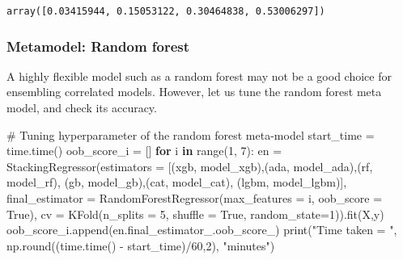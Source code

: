 \documentclass[
  letterpaper,
  DIV=11,
  numbers=noendperiod]{scrreprt}
\newenvironment{Shaded}{\begin{snugshade}}{\end{snugshade}}
\newcommand{\BuiltInTok}[1]{\textcolor[rgb]{0.00,0.23,0.31}{#1}}
\newcommand{\CommentTok}[1]{\textcolor[rgb]{0.37,0.37,0.37}{#1}}
\newcommand{\ControlFlowTok}[1]{\textcolor[rgb]{0.00,0.23,0.31}{\textbf{#1}}}
\newcommand{\DecValTok}[1]{\textcolor[rgb]{0.68,0.00,0.00}{#1}}
\newcommand{\KeywordTok}[1]{\textcolor[rgb]{0.00,0.23,0.31}{\textbf{#1}}}
\newcommand{\NormalTok}[1]{\textcolor[rgb]{0.00,0.23,0.31}{#1}}
\newcommand{\OperatorTok}[1]{\textcolor[rgb]{0.37,0.37,0.37}{#1}}
\newcommand{\StringTok}[1]{\textcolor[rgb]{0.13,0.47,0.30}{#1}}
\newcommand{\VariableTok}[1]{\textcolor[rgb]{0.07,0.07,0.07}{#1}}
\begin{document}
\begin{verbatim}
array([0.03415944, 0.15053122, 0.30464838, 0.53006297])
\end{verbatim}

\subsubsection{Metamodel: Random forest}\label{metamodel-random-forest}

A highly flexible model such as a random forest may not be a good choice
for ensembling correlated models. However, let us tune the random forest
meta model, and check its accuracy.

\begin{Shaded}
\begin{Highlighting}[]
\CommentTok{\# Tuning hyperparameter of the random forest meta{-}model}
\NormalTok{start\_time }\OperatorTok{=}\NormalTok{ time.time()}
\NormalTok{oob\_score\_i }\OperatorTok{=}\NormalTok{ []}
\ControlFlowTok{for}\NormalTok{ i }\KeywordTok{in} \BuiltInTok{range}\NormalTok{(}\DecValTok{1}\NormalTok{, }\DecValTok{7}\NormalTok{):}
\NormalTok{    en }\OperatorTok{=}\NormalTok{ StackingRegressor(estimators }\OperatorTok{=}\NormalTok{ [(}\StringTok{\textquotesingle{}xgb\textquotesingle{}}\NormalTok{, model\_xgb),(}\StringTok{\textquotesingle{}ada\textquotesingle{}}\NormalTok{, model\_ada),(}\StringTok{\textquotesingle{}rf\textquotesingle{}}\NormalTok{, model\_rf),}
\NormalTok{                        (}\StringTok{\textquotesingle{}gb\textquotesingle{}}\NormalTok{, model\_gb),(}\StringTok{\textquotesingle{}cat\textquotesingle{}}\NormalTok{, model\_cat), (}\StringTok{\textquotesingle{}lgbm\textquotesingle{}}\NormalTok{, model\_lgbm)],}
\NormalTok{                     final\_estimator }\OperatorTok{=}\NormalTok{ RandomForestRegressor(max\_features }\OperatorTok{=}\NormalTok{ i, oob\_score }\OperatorTok{=} \VariableTok{True}\NormalTok{),                                          }
\NormalTok{                    cv }\OperatorTok{=}\NormalTok{ KFold(n\_splits }\OperatorTok{=} \DecValTok{5}\NormalTok{, shuffle }\OperatorTok{=} \VariableTok{True}\NormalTok{, random\_state}\OperatorTok{=}\DecValTok{1}\NormalTok{)).fit(X,y)}
\NormalTok{    oob\_score\_i.append(en.final\_estimator\_.oob\_score\_)}
\BuiltInTok{print}\NormalTok{(}\StringTok{"Time taken = "}\NormalTok{, np.}\BuiltInTok{round}\NormalTok{((time.time() }\OperatorTok{{-}}\NormalTok{ start\_time)}\OperatorTok{/}\DecValTok{60}\NormalTok{,}\DecValTok{2}\NormalTok{), }\StringTok{"minutes"}\NormalTok{)}
\end{Highlighting}
\end{Shaded}
\end{document}
